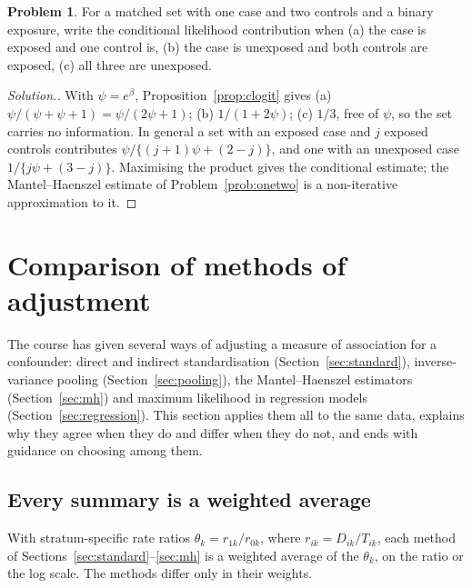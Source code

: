 \documentclass[11pt,a4paper]{article}
\numberwithin{equation}{section}
\theoremstyle{definition}
\newtheorem{problemx}{Problem}[subsection]
\newenvironment{problem}{\begin{problemx}}{\end{problemx}}
\newenvironment{solution}
  {\renewcommand{\qedsymbol}{}\begin{proof}[\textit{Solution}.]}
  {\end{proof}}
\begin{document}
\begin{problem}
For a matched set with one case and two controls and a binary exposure, write the conditional likelihood contribution when (a) the case
is exposed and one control is, (b) the case is unexposed and both controls are exposed, (c) all three are unexposed.
\end{problem}

\begin{solution}
With $\psi = e^\beta$, Proposition~\ref{prop:clogit} gives (a) $\psi/(\psi + \psi + 1) = \psi/(2\psi + 1)$; (b) $1/(1 + 2\psi)$; (c) $1/3$, free of $\psi$, so the set carries no
information. In general a set with an exposed case and $j$ exposed controls contributes $\psi/\{(j + 1)\psi + (2 - j)\}$, and one with an unexposed case
$1/\{j\psi + (3 - j)\}$. Maximising the product gives the conditional estimate; the Mantel--Haenszel estimate of Problem~\ref{prob:onetwo} is a
non-iterative approximation to it.
\end{solution}

\section{Comparison of methods of adjustment}
\label{sec:compare}

The course has given several ways of adjusting a measure of association for a confounder: direct and indirect standardisation
(Section~\ref{sec:standard}), inverse-variance pooling (Section~\ref{sec:pooling}), the Mantel--Haenszel estimators (Section~\ref{sec:mh})
and maximum likelihood in regression models (Section~\ref{sec:regression}). This section applies them all to the same data, explains
why they agree when they do and differ when they do not, and ends with guidance on choosing among them.

\subsection{Every summary is a weighted average}

With stratum-specific rate ratios $\theta_k = r_{1k}/r_{0k}$, where $r_{ik} = D_{ik}/T_{ik}$, each method of Sections~\ref{sec:standard}--\ref{sec:mh} is a weighted average of the
$\theta_k$, on the ratio or the log scale. The methods differ only in their weights.
\end{document}
